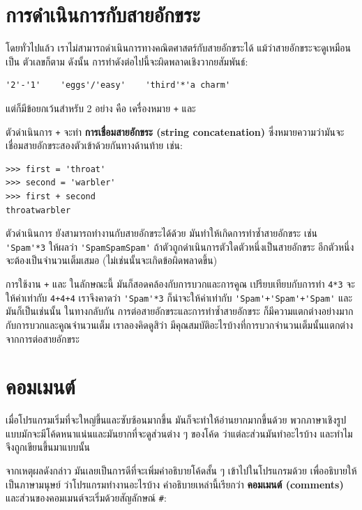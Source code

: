 \section{การดำเนินการกับสายอักขระ } %

โดยทั่วไปแล้ว เราไม่สามารถดำเนินการทางคณิตศาสตร์กับสายอักขระได้ แม้ว่าสายอักขระจะดูเหมือนเป็น
ตัวเลขก็ตาม  ดังนั้น การทำดังต่อไปนี้จะผิดพลาดเชิงวากยสัมพันธ์:

\begin{verbatim}
'2'-'1'    'eggs'/'easy'    'third'*'a charm'
\end{verbatim}
%
แต่ก็มีข้อยกเว้นสำหรับ 2 อย่าง คือ เครื่องหมาย {\tt +} และ {\tt *}

ตัวดำเนินการ {\tt +} จะทำ {\bf การเชื่อมสายอักขระ (string concatenation)} 
ซึ่งหมายความว่ามันจะเชื่อมสายอักขระสองตัวเข้าด้วยกันทางด้านท้าย เช่น:

\begin{verbatim}
>>> first = 'throat'
>>> second = 'warbler'
>>> first + second
throatwarbler
\end{verbatim}
%
ตัวดำเนินการ {\tt *} ยังสามารถทำงานกับสายอักขระได้ด้วย มันทำให้เกิดการทำซ้ำสายอักขระ เช่น 
\verb"'Spam'*3" ให้ผลว่า \verb"'SpamSpamSpam'" ถ้าตัวถูกดำเนินการตัวใดตัวหนึ่งเป็นสายอักขระ 
อีกตัวหนึ่งจะต้องเป็นจำนวนเต็มเสมอ (ไม่เช่นนั้นจะเกิดข้อผิดพลาดขึ้น) 

การใช้งาน {\tt +} และ {\tt *} ในลักษณะนี้ มันก็สอดคล้องกับการบวกและการคูณ
เปรียบเทียบกับการทำ {\tt 4*3} จะให้ค่าเท่ากับ {\tt 4+4+4} เราจึงคาดว่า \verb"'Spam'*3" 
ก็น่าจะให้ค่าเท่ากับ \verb"'Spam'+'Spam'+'Spam'" และมันก็เป็นเช่นนั้น  ในทางกลับกัน 
การต่อสายอักขระและการทำซ้ำสายอักขระ ก็มีความแตกต่างอย่างมากกับการบวกและคูณจำนวนเต็ม
เราลองคิดดูสิว่า มีคุณสมบัติอะไรบ้างที่การบวกจำนวนเต็มนั้นแตกต่างจากการต่อสายอักขระ


\section{คอมเมนต์ } %

เมื่อโปรแกรมเริ่มที่จะใหญ่ขึ้นและซับซ้อนมากขึ้น มันก็จะทำให้อ่านยากมากขึ้นด้วย  
พวกภาษาเชิงรูปแบบมักจะมีโค้ดหนาแน่นและมันยากที่จะดูส่วนต่าง ๆ ของโค้ด 
ว่าแต่ละส่วนมันทำอะไรบ้าง และทำไมจึงถูกเขียนขึ้นมาแบบนั้น

จากเหตุผลดังกล่าว มันเลยเป็นการดีที่จะเพิ่มคำอธิบายโค้ดสั้น ๆ เข้าไปในโปรแกรมด้วย 
เพื่ออธิบายให้เป็นภาษามนุษย์ ว่าโปรแกรมทำงานอะไรบ้าง คำอธิบายเหล่านี้เรียกว่า 
{\bf คอมเมนต์ (comments)} และส่วนของคอมเมนต์จะเริ่มด้วยสัญลักษณ์ \verb"#":

